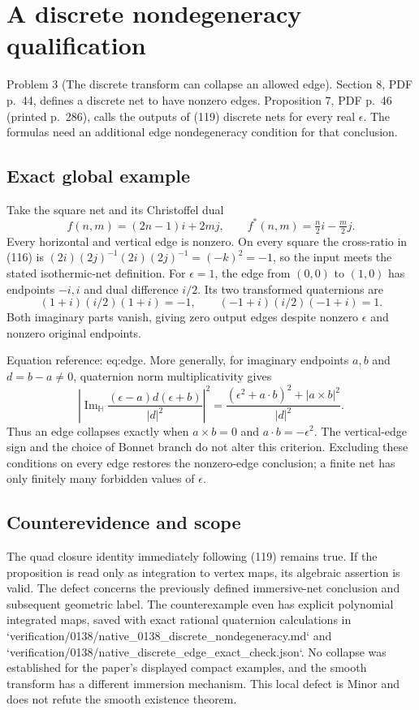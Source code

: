 \documentclass[10pt]{article}
\begin{document}
\section*{A discrete nondegeneracy qualification}
Problem 3 (The discrete transform can collapse an allowed edge).  Section 8, PDF p. 44, defines a discrete net to have nonzero edges. Proposition 7, PDF p. 46 (printed p. 286), calls the outputs of (119) discrete nets for every real \(\epsilon\). The formulas need an additional edge nondegeneracy condition for that conclusion.\par
\subsection*{Exact global example}
Take the square net and its Christoffel dual \[f(n,m)=(2n-1)i+2mj,\qquad
 f^*(n,m)=\tfrac n2 i-\tfrac m2 j.\] Every horizontal and vertical edge is nonzero. On every square the cross-ratio in (116) is \((2i)(2j)^{-1}(2i)(2j)^{-1}=(-k)^2=-1\), so the input meets the stated isothermic-net definition. For \(\epsilon=1\), the edge from \((0,0)\) to \((1,0)\) has endpoints \(-i,i\) and dual difference \(i/2\). Its two transformed quaternions are \[(1+i)(i/2)(1+i)=-1,\qquad
 (-1+i)(i/2)(-1+i)=1.\] Both imaginary parts vanish, giving zero output edges despite nonzero \(\epsilon\) and nonzero original endpoints.\par
Equation reference: eq:edge. More generally, for imaginary endpoints \(a,b\) and \(d=b-a\ne0\), quaternion norm multiplicativity gives \[
 \left|\operatorname{Im}_{\mathbb H}\frac{(\epsilon-a)d(\epsilon+b)}{|d|^2}\right|^2
 =\frac{(\epsilon^2+a\cdot b)^2+|a\times b|^2}{|d|^2}.\] Thus an edge collapses exactly when \(a\times b=0\) and \(a\cdot b=-\epsilon^2\). The vertical-edge sign and the choice of Bonnet branch do not alter this criterion. Excluding these conditions on every edge restores the nonzero-edge conclusion; a finite net has only finitely many forbidden values of \(\epsilon\).\par
\subsection*{Counterevidence and scope}
The quad closure identity immediately following (119) remains true. If the proposition is read only as integration to vertex maps, its algebraic assertion is valid. The defect concerns the previously defined immersive-net conclusion and subsequent geometric label. The counterexample even has explicit polynomial integrated maps, saved with exact rational quaternion calculations in `verification/0138/native\_0138\_discrete\_nondegeneracy.md` and `verification/0138/native\_discrete\_edge\_exact\_check.json`. No collapse was established for the paper’s displayed compact examples, and the smooth transform has a different immersion mechanism. This local defect is Minor and does not refute the smooth existence theorem.\par
\end{document}
